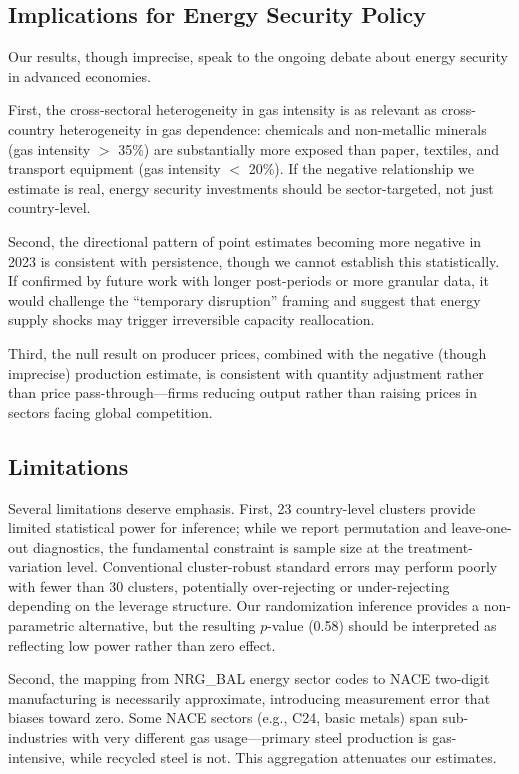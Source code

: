 \documentclass[12pt]{article}
\begin{document}
\subsection{Implications for Energy Security Policy}

Our results, though imprecise, speak to the ongoing debate about energy security in advanced economies.

First, the cross-sectoral heterogeneity in gas intensity is as relevant as cross-country heterogeneity in gas dependence: chemicals and non-metallic minerals (gas intensity $>$ 35\%) are substantially more exposed than paper, textiles, and transport equipment (gas intensity $<$ 20\%). If the negative relationship we estimate is real, energy security investments should be sector-targeted, not just country-level.

Second, the directional pattern of point estimates becoming more negative in 2023 is consistent with persistence, though we cannot establish this statistically. If confirmed by future work with longer post-periods or more granular data, it would challenge the ``temporary disruption'' framing and suggest that energy supply shocks may trigger irreversible capacity reallocation.

Third, the null result on producer prices, combined with the negative (though imprecise) production estimate, is consistent with quantity adjustment rather than price pass-through---firms reducing output rather than raising prices in sectors facing global competition.

\subsection{Limitations}

Several limitations deserve emphasis. First, 23 country-level clusters provide limited statistical power for inference; while we report permutation and leave-one-out diagnostics, the fundamental constraint is sample size at the treatment-variation level. Conventional cluster-robust standard errors may perform poorly with fewer than 30 clusters, potentially over-rejecting or under-rejecting depending on the leverage structure. Our randomization inference provides a non-parametric alternative, but the resulting $p$-value (0.58) should be interpreted as reflecting low power rather than zero effect.

Second, the mapping from NRG\_BAL energy sector codes to NACE two-digit manufacturing is necessarily approximate, introducing measurement error that biases toward zero. Some NACE sectors (e.g., C24, basic metals) span sub-industries with very different gas usage---primary steel production is gas-intensive, while recycled steel is not. This aggregation attenuates our estimates.
\end{document}
